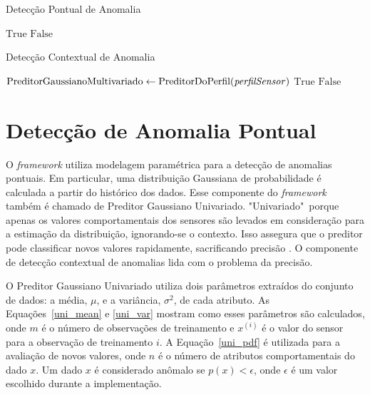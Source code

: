 \documentclass[cic,tc]{iiufrgs}
\begin{document}
\begin{algorithm}
\caption{Detecção Pontual de Anomalia}
\label{alg_2}
\begin{algorithmic}[1]
\State \Return $\text{True}$
\Else
\State \Return $\text{False}$
\EndIf
\EndProcedure
\end{algorithmic}
\end{algorithm}

\begin{algorithm}
\caption{Detecção Contextual de Anomalia}
\label{alg_3}
\begin{algorithmic}[1]
\State $\text{PreditorGaussianoMultivariado} \gets \text{PreditorDoPerfil(\textit{perfilSensor})}$
\State \Return $\text{True}$
\Else
\State \Return $\text{False}$
\EndIf
\EndProcedure
\end{algorithmic}
\end{algorithm}

\section{Detecção de Anomalia Pontual}
\label{anom_pont}
O \textit{framework} utiliza modelagem paramétrica para a detecção de anomalias pontuais. Em particular, uma distribuição Gaussiana de probabilidade é calculada a partir do histórico dos dados. Esse componente do \textit{framework} também é chamado de Preditor Gaussiano Univariado. "Univariado"~porque apenas os valores comportamentais dos sensores são levados em consideração para a estimação da distribuição, ignorando-se o contexto. Isso assegura que o preditor pode classificar novos valores rapidamente, sacrificando precisão \cite{ContextualMichael2014}. O componente de detecção contextual de anomalias lida com o problema da precisão.

O Preditor Gaussiano Univariado utiliza dois parâmetros extraídos do conjunto de dados: a média, $\mu$, e a variância, $\sigma^2$, de cada atributo. As Equações~\ref{uni_mean} e \ref{uni_var} mostram como esses parâmetros são calculados, onde $m$ é o número de observações de treinamento e $x^{(i)}$ é o valor do sensor para a observação de treinamento $i$. A Equação~\ref{uni_pdf} é utilizada para a avaliação de novos valores, onde $n$ é o número de atributos comportamentais do dado $x$. Um dado $x$ é considerado anômalo se $p(x) < \epsilon$, onde $\epsilon$ é um valor escolhido durante a implementação.
\end{document}
